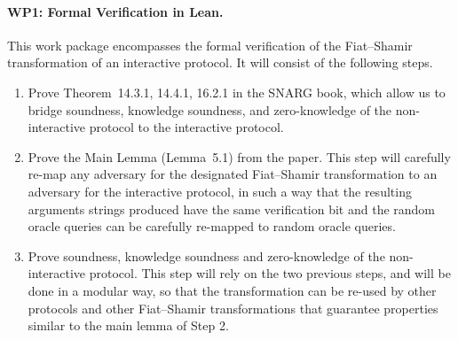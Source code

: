 \documentclass{article}
\begin{document}
\paragraph{WP1: Formal Verification in Lean.}
This work package encompasses the formal verification of the Fiat--Shamir transformation of an interactive protocol. It will consist of the following steps.
\begin{enumerate}[label=\textbf{Step \arabic*:}, leftmargin=*, itemsep=0.5em]
    \item Prove Theorem~14.3.1, 14.4.1, 16.2.1 in the SNARG book, which allow us to bridge soundness, knowledge soundness, and zero-knowledge of the non-interactive protocol to the interactive protocol.
    \item Prove the Main Lemma (Lemma~5.1) from the paper. This step will carefully re-map any adversary for the designated Fiat--Shamir transformation to an adversary for the interactive protocol, in such a way that the resulting arguments strings produced have the same verification bit and the random oracle queries can be carefully re-mapped to random oracle queries.
    \item Prove soundness, knowledge soundness and zero-knowledge of the non-interactive protocol. This step will rely on the two previous steps, and will be done in a modular way, so that the transformation can be re-used by other protocols and other Fiat--Shamir transformations that guarantee properties similar to the main lemma of Step 2.
\end{enumerate}
\end{document}
